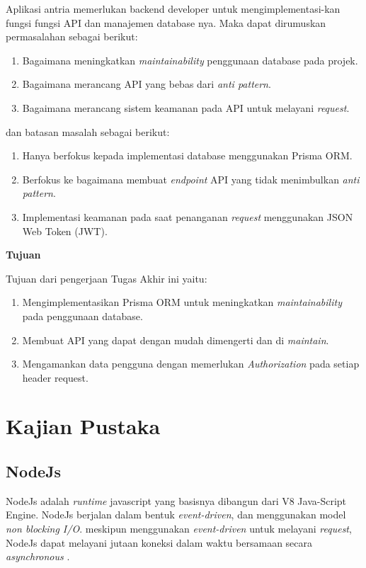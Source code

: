 Aplikasi antria memerlukan backend developer untuk mengimplementasi-kan fungsi fungsi API dan manajemen database nya. Maka dapat dirumuskan permasalahan sebagai berikut:
\begin{enumerate}
  \item Bagaimana meningkatkan \textit{maintainability} penggunaan database pada projek.
  \item Bagaimana merancang API yang bebas dari \textit{anti pattern}.
  \item Bagaimana merancang sistem keamanan pada API untuk melayani \textit{request}.
\end{enumerate}
dan batasan masalah sebagai berikut:
\begin{enumerate}
  \item Hanya berfokus kepada implementasi database menggunakan Prisma ORM.
  \item Berfokus ke bagaimana membuat \textit{endpoint} API yang tidak menimbulkan \textit{anti pattern}.
  \item Implementasi keamanan pada saat penanganan \textit{request} menggunakan JSON Web Token (JWT).
\end{enumerate}


\noindent\textbf{Tujuan}

Tujuan dari pengerjaan Tugas Akhir ini yaitu:
\begin{enumerate}
  \item Mengimplementasikan Prisma ORM untuk meningkatkan \textit{maintainability} pada penggunaan database.
  \item Membuat API yang dapat dengan mudah dimengerti dan di \textit{maintain}.
  \item Mengamankan data pengguna dengan memerlukan \textit{Authorization} pada setiap header request.
  
\end{enumerate}



\section{Kajian Pustaka}
\subsection{NodeJs}
NodeJs adalah \textit{runtime} javascript yang basisnya dibangun dari V8 Java-Script Engine. NodeJs berjalan dalam bentuk \textit{event-driven}, dan menggunakan model \textit{non blocking I/O}. meskipun menggunakan \textit{event-driven} untuk melayani \textit{request}, NodeJs dapat melayani jutaan koneksi dalam waktu bersamaan secara \textit{asynchronous} \cite{shah2017node}.

